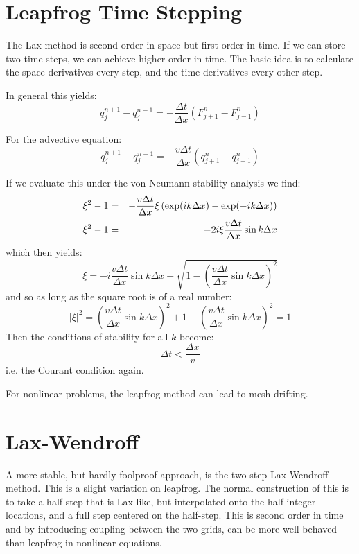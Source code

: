 \section{Leapfrog Time Stepping}

The Lax method is second order in space but first order in time. If we
can store two time steps, we can achieve higher order in time. The
basic idea is to calculate the space derivatives every step, and the
time derivatives every other step. 

In general this yields:
\begin{equation}
q_j^{n+1} - q_j^{n-1} = - \frac{\Delta t}{\Delta x} \left(F_{j+1}^n -
F_{j-1}^n\right)
\end{equation}

For the advective equation:
\begin{equation}
q_j^{n+1} - q_j^{n-1} = - \frac{ v \Delta t}{\Delta x} \left(q_{j+1}^n
- q_{j-1}^n\right)
\end{equation}

If we evaluate this under the von Neumann stability analysis we find:
\begin{eqnarray}
\xi^2 - 1 &=& - \frac{v \Delta t}{\Delta x} \xi \left(\exp(i k \Delta x)
- \exp(- i k \Delta x) \right) \cr
\xi^2 - 1 &=& - 2i \xi \frac{v \Delta t}{\Delta x} \sin k\Delta x 
\end{eqnarray}
which then yields:
\begin{equation}
\xi = - i \frac{v \Delta t}{\Delta x} \sin k\Delta x \pm
\sqrt{1 - \left(\frac{v \Delta t}{\Delta x} \sin k\Delta x \right)^2}
\end{equation}
and so as long as the square root is of a real number:
\begin{equation}
|\xi|^2 = \left(\frac{v \Delta t}{\Delta x} \sin k\Delta x \right)^2 +
 1 - \left(\frac{v \Delta t}{\Delta x} \sin k\Delta x \right)^2 = 1
\end{equation}
Then the conditions of stability for all $k$ become:
\begin{equation}
\Delta t < \frac{\Delta x}{v}
\end{equation}
i.e. the Courant condition again.

For nonlinear problems, the leapfrog method can lead to
mesh-drifting.

\section{Lax-Wendroff}

A more stable, but hardly foolproof approach, is the two-step
Lax-Wendroff method. This is a slight variation on leapfrog. The
normal construction of this is to take a half-step that is Lax-like,
but interpolated onto the half-integer locations, and a full step
centered on the half-step. This is second order in time and by
introducing coupling between the two grids, can be more well-behaved
than leapfrog in nonlinear equations.

